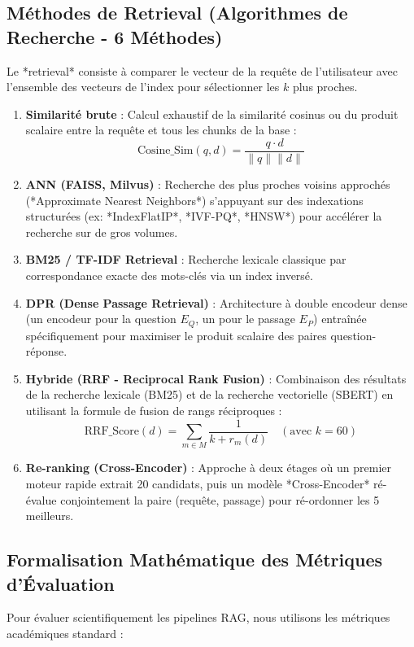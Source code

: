 \documentclass[12pt,a4paper,oneside]{report}
\begin{document}
\subsection{Méthodes de Retrieval (Algorithmes de Recherche - 6 Méthodes)}
Le *retrieval* consiste à comparer le vecteur de la requête de l'utilisateur avec l'ensemble des vecteurs de l'index pour sélectionner les $k$ plus proches.

\begin{enumerate}
    \item \textbf{Similarité brute} : Calcul exhaustif de la similarité cosinus ou du produit scalaire entre la requête et tous les chunks de la base :
    \begin{equation}
    \text{Cosine\_Sim}(q, d) = \frac{q \cdot d}{\|q\| \|d\|}
    \end{equation}
    \item \textbf{ANN (FAISS, Milvus)} : Recherche des plus proches voisins approchés (*Approximate Nearest Neighbors*) s'appuyant sur des indexations structurées (ex: *IndexFlatIP*, *IVF-PQ*, *HNSW*) pour accélérer la recherche sur de gros volumes.
    \item \textbf{BM25 / TF-IDF Retrieval} : Recherche lexicale classique par correspondance exacte des mots-clés via un index inversé.
    \item \textbf{DPR (Dense Passage Retrieval)} : Architecture à double encodeur dense (un encodeur pour la question $E_Q$, un pour le passage $E_P$) entraînée spécifiquement pour maximiser le produit scalaire des paires question-réponse.
    \item \textbf{Hybride (RRF - Reciprocal Rank Fusion)} : Combinaison des résultats de la recherche lexicale (BM25) et de la recherche vectorielle (SBERT) en utilisant la formule de fusion de rangs réciproques :
    \begin{equation}
    \text{RRF\_Score}(d) = \sum_{m \in M} \frac{1}{k + r_m(d)} \quad (\text{avec } k = 60)
    \end{equation}
    \item \textbf{Re-ranking (Cross-Encoder)} : Approche à deux étages où un premier moteur rapide extrait 20 candidats, puis un modèle *Cross-Encoder* ré-évalue conjointement la paire (requête, passage) pour ré-ordonner les 5 meilleurs.
\end{enumerate}

\subsection{Formalisation Mathématique des Métriques d'Évaluation}
Pour évaluer scientifiquement les pipelines RAG, nous utilisons les métriques académiques standard :
\end{document}
